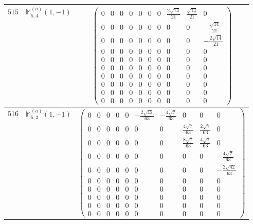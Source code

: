\documentclass[fleqn,8pt,landscape]{jsarticle}
\begin{document}
\begin{center}
\begin{longtable}{ccc}
$ 515 $ & $ \mathbb{M}_{5,4}^{(a)}(1,-1) $ & $ \begin{pmatrix} 0 & 0 & 0 & 0 & 0 & 0 & 0 & \frac{2 \sqrt{14}}{21} & \frac{\sqrt{14}}{21} & 0 \\ 0 & 0 & 0 & 0 & 0 & 0 & 0 & 0 & 0 & - \frac{\sqrt{14}}{21} \\ 0 & 0 & 0 & 0 & 0 & 0 & 0 & 0 & 0 & - \frac{2 \sqrt{14}}{21} \\ 0 & 0 & 0 & 0 & 0 & 0 & 0 & 0 & 0 & 0 \\ 0 & 0 & 0 & 0 & 0 & 0 & 0 & 0 & 0 & 0 \\ 0 & 0 & 0 & 0 & 0 & 0 & 0 & 0 & 0 & 0 \\ 0 & 0 & 0 & 0 & 0 & 0 & 0 & 0 & 0 & 0 \\ 0 & 0 & 0 & 0 & 0 & 0 & 0 & 0 & 0 & 0 \\ 0 & 0 & 0 & 0 & 0 & 0 & 0 & 0 & 0 & 0 \\ 0 & 0 & 0 & 0 & 0 & 0 & 0 & 0 & 0 & 0 \end{pmatrix} $ \\ \hline
$ 516 $ & $ \mathbb{M}_{5,3}^{(a)}(1,-1) $ & $ \begin{pmatrix} 0 & 0 & 0 & 0 & 0 & - \frac{2 \sqrt{42}}{63} & - \frac{4 \sqrt{7}}{63} & 0 & 0 & 0 \\ 0 & 0 & 0 & 0 & 0 & 0 & 0 & \frac{4 \sqrt{7}}{63} & \frac{2 \sqrt{7}}{63} & 0 \\ 0 & 0 & 0 & 0 & 0 & 0 & 0 & \frac{8 \sqrt{7}}{63} & \frac{4 \sqrt{7}}{63} & 0 \\ 0 & 0 & 0 & 0 & 0 & 0 & 0 & 0 & 0 & - \frac{4 \sqrt{7}}{63} \\ 0 & 0 & 0 & 0 & 0 & 0 & 0 & 0 & 0 & - \frac{2 \sqrt{42}}{63} \\ 0 & 0 & 0 & 0 & 0 & 0 & 0 & 0 & 0 & 0 \\ 0 & 0 & 0 & 0 & 0 & 0 & 0 & 0 & 0 & 0 \\ 0 & 0 & 0 & 0 & 0 & 0 & 0 & 0 & 0 & 0 \\ 0 & 0 & 0 & 0 & 0 & 0 & 0 & 0 & 0 & 0 \\ 0 & 0 & 0 & 0 & 0 & 0 & 0 & 0 & 0 & 0 \end{pmatrix} $ \\ \hline

\end{longtable}
\end{center}
\end{document}
